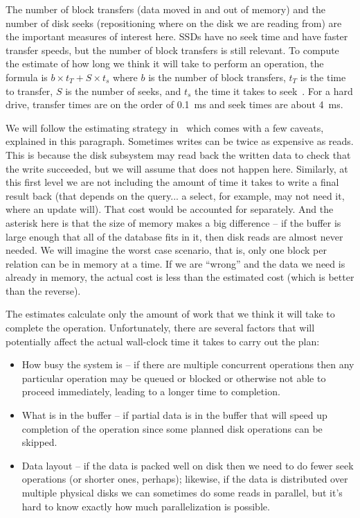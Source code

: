 \documentclass[a4paper]{report}
\begin{document}
The number of block transfers (data moved in and out of memory) and the number of disk seeks (repositioning where on the disk we are reading from) are the important measures of interest here. SSDs have no seek time and have faster transfer speeds, but the number of block transfers is still relevant. To compute the estimate of how long we think it will take to perform an operation, the formula is $b \times t_{T} + S \times t_{s}$ where $b$ is the number of block transfers, $t_{T}$ is the time to transfer, $S$ is the number of seeks, and $t_{s}$ the time it takes to seek~\cite{dsc}. For a hard drive, transfer times are on the order of 0.1~ms and seek times are about 4~ms.

We will follow the estimating strategy in~\cite{dsc} which comes with a few caveats, explained in this paragraph. Sometimes writes can be twice as expensive as reads. This is because the disk subsystem may read back the written data to check that the write succeeded, but we will assume that does not happen here. Similarly, at this first level we are not including the amount of time it takes to write a final result back (that depends on the query... a select, for example, may not need it, where an update will). That cost would be accounted for separately. And the asterisk here is that the size of memory makes a big difference -- if the buffer is large enough that all of the database fits in it, then disk reads are almost never needed. We will imagine the worst case scenario, that is, only one block per relation can be in memory at a time. If we are ``wrong'' and the data we need is already in memory, the actual cost is less than the estimated cost (which is better than the reverse). 

The estimates calculate only the amount of work that we think it will take to complete the operation. Unfortunately, there are several factors that will potentially affect the actual wall-clock time it takes to carry out the plan:

\begin{itemize}
	\item How busy the system is -- if there are multiple concurrent operations then any particular operation may be queued or blocked or otherwise not able to proceed immediately, leading to a longer time to completion.
	\item What is in the buffer -- if partial data is in the buffer that will speed up completion of the operation since some planned disk operations can be skipped.
	\item Data layout -- if the data is packed well on disk then we need to do fewer seek operations (or shorter ones, perhaps); likewise, if the data is distributed over multiple physical disks we can sometimes do some reads in parallel, but it's hard to know exactly how much parallelization is possible.
\end{itemize}
\end{document}
